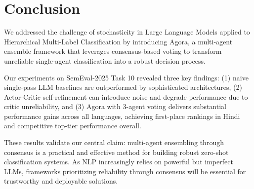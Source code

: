 \section{Conclusion}

We addressed the challenge of stochasticity in Large Language Models applied to Hierarchical Multi-Label Classification by introducing Agora, a multi-agent ensemble framework that leverages consensus-based voting to transform unreliable single-agent classification into a robust decision process.

Our experiments on SemEval-2025 Task 10 revealed three key findings: (1) naive single-pass LLM baselines are outperformed by sophisticated architectures, (2) Actor-Critic self-refinement can introduce noise and degrade performance due to critic unreliability, and (3) Agora with 3-agent voting delivers substantial performance gains across all languages, achieving first-place rankings in Hindi and competitive top-tier performance overall.

These results validate our central claim: multi-agent ensembling through consensus is a practical and effective method for building robust zero-shot classification systems. As NLP increasingly relies on powerful but imperfect LLMs, frameworks prioritizing reliability through consensus will be essential for trustworthy and deployable solutions.
